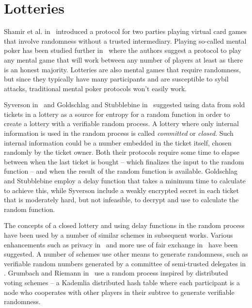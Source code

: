 \section{Lotteries}
\label{sec:lotteries}

Shamir et al. in~\cite{shamir_mental_1981} introduced a protocol for two parties playing virtual card games that involve randomness without a trusted intermediary. Playing so-called mental poker has been studied further in~\cite{goldreich_how_1987} where the authors suggest a protocol to play any mental game that will work between any number of players at least as there is an honest majority. Lotteries are also mental games that require randomness, but since they typically have many participants and are susceptible to sybil attacks, traditional mental poker protocols won't easily work.

Syverson in~\cite{syverson_weakly_1998} and Goldschlag and Stubblebine in~\cite{goldschlag_publicly_1998} suggested using data from sold tickets in a lottery as a source for entropy for a random function in order to create a lottery with a verifiable random process. A lottery where only internal information is used in the random process is called \emph{committed} or \emph{closed}. Such internal information could be a number embedded in the ticket itself, chosen randomly by the ticket owner. Both their protocols require some time to elapse between when the last ticket is bought – which finalizes the input to the random function – and when the result of the random function is available. Goldschlag and Stubblebine employ a delay function that takes a minimum time to calculate to achieve this, while Syverson include a weakly encrypted secret in each ticket that is moderately hard, but not infeasible, to decrypt and use to calculate the random function.

The concepts of a closed lottery and using delay functions in the random process have been used by a number of similar schemes in subsequent works. Various enhancements such as privacy in~\cite{zhou_playing_2001} and more use of fair exchange in~\cite{chow_e-lottery_2005} have been suggested. A number of schemes use other means to generate randomness, such as verifiable random numbers generated by a committee of semi-trusted delegates in \cite{fouque_sharing_2001, lee_design_2009, liu_improved_2014, xia_information_2019}. Grumbach and Riemann in~\cite{grumbach_distributed_2017} use a random process inspired by distributed voting schemes – a Kademlia distributed hash table where each participant is a node who cooperates with other players in their subtree to generate verifiable randomness. 

